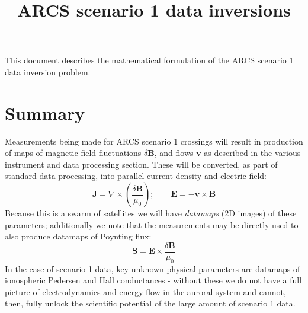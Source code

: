 \documentclass[11pt,letterpaper]{article}
\begin{document}
\setlength{\parindent}{0mm}
\setlength{\parskip}{0.4cm}




\title{ARCS scenario 1 data inversions}

\maketitle

\tableofcontents

\pagebreak


This document describes the mathematical formulation of the ARCS scenario 1 data inversion problem.  


\section{Summary}

Measurements being made for ARCS scenario 1 crossings will result in production of maps of magnetic field fluctuations $\delta \mathbf{B}$, and flows $\mathbf{v}$ as described in the various instrument and data processing section.  These will be converted, as part of standard data processing, into parallel current density and electric field:
\begin{equation}
\mathbf{J} = \nabla \times \left( \frac{\delta \mathbf{B}}{\mu_0} \right); \qquad \mathbf{E} = -\mathbf{v} \times \mathbf{B}
\end{equation}
Because this is a swarm of satellites we will have \emph{datamaps} (2D images) of these parameters; additionally we note that the measurements may be directly used to also produce datamaps of Poynting flux:
\begin{equation}
\mathbf{S} = \mathbf{E} \times \frac{\delta \mathbf{B}}{\mu_0}
\end{equation}
In the case of scenario 1 data,  key unknown physical parameters are datamaps of ionospheric Pedersen and Hall conductances - without these we do not have a full picture of electrodynamics and energy flow in the auroral system and cannot, then, fully unlock the scientific potential of the large amount of scenario 1 data.  
\end{document}
